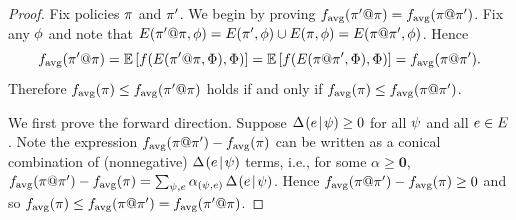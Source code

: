 \begin{proof}
Fix policies $\pi$ and $\pi'$.
We begin by proving $f_{\text{avg}}( {\pi'}@{\pi}) = f_{\text{avg}}( {\pi}@{\pi'})$.  Fix any ${\color{black}{\ensuremath{\phi}}}$ and 
note that 
$E({{\pi'}@{\pi}}, {{\color{black}{\ensuremath{\phi}}}}) = E({\pi'}, {{\color{black}{\ensuremath{\phi}}}}) \cup  E({\pi}, {{\color{black}{\ensuremath{\phi}}}}) = E({{\pi}@{\pi'}}, {{\color{black}{\ensuremath{\phi}}}})$.
Hence $$f_{\text{avg}}({\pi'}@{\pi}) = \mathbb{E}\left[f(E({{\pi'}@{\pi}}, {{\color{black}{\ensuremath{\Phi}}}}), {\color{black}{\ensuremath{\Phi}}})\right] =
\mathbb{E}\left[f(E({{\pi}@{\pi'}}, {{\color{black}{\ensuremath{\Phi}}}}), {\color{black}{\ensuremath{\Phi}}})\right] = f_{\text{avg}}({\pi}@{\pi'}).$$
Therefore 
$f_{\text{avg}}(\pi)\leq f_{\text{avg}}({\pi'}@{\pi})$ holds if and
only if $f_{\text{avg}}(\pi)\leq f_{\text{avg}}( {\pi}@{\pi'})$.  
%


We first prove the forward direction.
Suppose $\Delta \hspace{-0.3mm} \left( { {e}\! \mid \! {{\color{black}{\ensuremath{\psi}}}} } \right)   \ge 0$ for all ${\color{black}{\ensuremath{\psi}}}$ and all $e \in E$.
Note the expression $f_{\text{avg}}( {\pi}@{\pi'}) - f_{\text{avg}}(\pi)$ can be written as a conical combination of (nonnegative) $\Delta \hspace{-0.3mm} \left( { {e}\! \mid \! {{\color{black}{\ensuremath{\psi}}}} } \right)  $ terms, i.e., 
for some $\alpha \ge \mathbf{0}$,  $f_{\text{avg}}( {\pi}@{\pi'}) - f_{\text{avg}}(\pi) = \sum_{{\color{black}{\ensuremath{\psi}}},e} \alpha_{({\color{black}{\ensuremath{\psi}}},e)}\, \Delta \hspace{-0.3mm} \left( { {e}\! \mid \! {{\color{black}{\ensuremath{\psi}}}} } \right)  $. 
Hence $f_{\text{avg}}( {\pi}@{\pi'}) - f_{\text{avg}}(\pi) \ge 0$ and so $f_{\text{avg}}(\pi)\leq f_{\text{avg}}({\pi}@{\pi'}) = f_{\text{avg}}({\pi'}@{\pi})$.



\end{proof}
